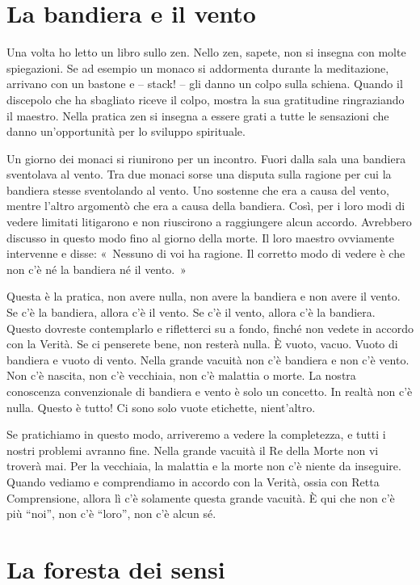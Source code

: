 \section{La bandiera e il vento}

Una volta ho letto un libro sullo zen. Nello zen, sapete, non si insegna
con molte spiegazioni. Se ad esempio un monaco si addormenta durante la
meditazione, arrivano con un bastone e -- stack! -- gli danno un colpo
sulla schiena. Quando il discepolo che ha sbagliato riceve il colpo,
mostra la sua gratitudine ringraziando il maestro. Nella pratica zen si
insegna a essere grati a tutte le sensazioni che danno un'opportunità
per lo sviluppo spirituale.

Un giorno dei monaci si riunirono per un incontro. Fuori dalla sala una
bandiera sventolava al vento. Tra due monaci sorse una disputa sulla
ragione per cui la bandiera stesse sventolando al vento. Uno sostenne
che era a causa del vento, mentre l'altro argomentò che era a causa
della bandiera. Così, per i loro modi di vedere limitati litigarono e
non riuscirono a raggiungere alcun accordo. Avrebbero discusso in questo
modo fino al giorno della morte. Il loro maestro ovviamente intervenne e
disse: «~Nessuno di voi ha ragione. Il corretto modo di vedere è che non
c'è né la bandiera né il vento.~»

Questa è la pratica, non avere nulla, non avere la bandiera e non avere
il vento. Se c'è la bandiera, allora c'è il vento. Se c'è il vento,
allora c'è la bandiera. Questo dovreste contemplarlo e rifletterci su a
fondo, finché non vedete in accordo con la Verità. Se ci penserete bene,
non resterà nulla. È vuoto, vacuo. Vuoto di bandiera e vuoto di vento.
Nella grande vacuità non c'è bandiera e non c'è vento. Non c'è nascita,
non c'è vecchiaia, non c'è malattia o morte. La nostra conoscenza
convenzionale di bandiera e vento è solo un concetto. In realtà non c'è
nulla. Questo è tutto! Ci sono solo vuote etichette, nient'altro.

Se pratichiamo in questo modo, arriveremo a vedere la completezza, e
tutti i nostri problemi avranno fine. Nella grande vacuità il Re della
Morte non vi troverà mai. Per la vecchiaia, la malattia e la morte non
c'è niente da inseguire. Quando vediamo e comprendiamo in accordo con la
Verità, ossia con Retta Comprensione, allora lì c'è solamente questa
grande vacuità. È qui che non c'è più ``noi'', non c'è ``loro'', non c'è
alcun sé.

\section{La foresta dei sensi}

